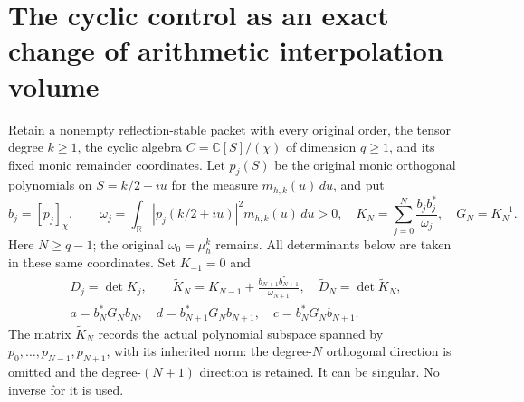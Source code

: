 \section{The cyclic control as an exact change of arithmetic interpolation volume}
\label{sec:cyclic-control-determinant-increments}

Retain a nonempty reflection-stable packet with every original order,
the tensor degree $k\geq1$, the cyclic algebra
$C=\mathbb C[S]/(\chi)$ of dimension $q\geq1$, and its fixed monic
remainder coordinates. Let $p_j(S)$ be the original monic orthogonal
polynomials on $S=k/2+iu$ for the measure $m_{h,k}(u)\,du$, and put
\[
 b_j=[p_j]_\chi,\qquad
 \omega_j=\int_{\mathbb R}|p_j(k/2+iu)|^2m_{h,k}(u)\,du>0,
 \quad K_N=\sum_{j=0}^N\frac{b_jb_j^*}{\omega_j},\quad G_N=K_N^{-1}.
 \tag{CV.1}
\]
Here $N\geq q-1$; the original $\omega_0=\mu_h^k$ remains.
All determinants below are taken in these same coordinates.
Set $K_{-1}=0$ and
\[
 \begin{gathered}
 D_j=\det K_j,\qquad
 \widetilde K_N=K_{N-1}+\frac{b_{N+1}b_{N+1}^*}{\omega_{N+1}},
 \quad\widetilde D_N=\det\widetilde K_N,\\
 a=b_N^*G_Nb_N,\quad d=b_{N+1}^*G_Nb_{N+1},\quad
 c=b_N^*G_Nb_{N+1}.
 \end{gathered}
 \tag{CV.2}
\]
The matrix $\widetilde K_N$ records the actual polynomial subspace
spanned by $p_0,\ldots,p_{N-1},p_{N+1}$, with its inherited norm:
the degree-$N$ orthogonal direction is omitted and the degree-$(N+1)$
direction is retained. It can be singular. No inverse for it is used.

